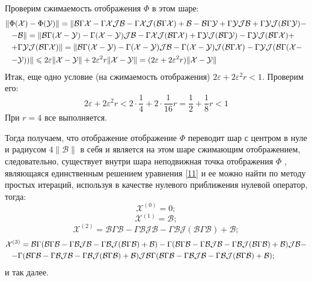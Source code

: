
Проверим сжимаемость отображения $\Phi$ в этом шаре:
\begin{multline*}
\|\Phi (\mathcal{X}) - \Phi (\mathcal{Y}) \| = \| \mathcal{B}\Gamma \mathcal{X} - \Gamma \mathcal{XJB} - \Gamma \mathcal{XJ}(\mathcal{B}\Gamma\mathcal{X}) + \mathcal{B} - \mathcal{B}\Gamma \mathcal{Y} + \Gamma \mathcal{YJB} + \Gamma \mathcal{YJ}(\mathcal{B}\Gamma\mathcal{Y}) - \\ 
\shoveleft{ -\mathcal{B}\| = \| \mathcal{B}\Gamma (\mathcal{X-Y}) - \Gamma (\mathcal{X-Y})\mathcal{JB} - \Gamma\mathcal{XJ}(\mathcal{B}\Gamma\mathcal{X}) + \Gamma \mathcal{YJ} (\mathcal{B}\Gamma\mathcal{Y}) - \Gamma\mathcal{YJ}(\mathcal{B}\Gamma\mathcal{X}) +}\\
\shoveleft{ + \Gamma \mathcal{YJ}(\mathcal{B}\Gamma\mathcal{X}) \| = \| \mathcal{B}\Gamma(\mathcal{X-Y}) - \Gamma\mathcal{(X-Y)}\mathcal{JB} - \Gamma (\mathcal{X- Y}) \mathcal{J}(\mathcal{B}\Gamma\mathcal{X}) - \Gamma \mathcal{YJ}(\mathcal{B}\Gamma(\mathcal{X}-}\\
\shoveleft{ -\mathcal{Y})) \| \leqslant 2\varepsilon \| \mathcal{X-Y} \| + 2\varepsilon ^2 r\| \mathcal{X-Y} \| = (2\varepsilon + 2\varepsilon ^2 r)\| \mathcal{X-Y} \|}\\ 
\end{multline*}
Итак, еще одно условие (на сжимаемость отображения) $2\varepsilon + 2\varepsilon ^2 r < 1.$ Проверим его:
$$
2\varepsilon + 2\varepsilon ^2 r < 2 \cdot \frac{1}{4} + 2 \cdot \frac{1}{16} r = \frac{1}{2} + \frac{1}{8} r < 1
$$
При $r = 4$ все выполняется.

Тогда получаем, что отображение отображение $\Phi$ переводит шар с центром в нуле и радиусом $4\|\mathcal{B}\|$ в себя и является на этом шаре сжимающим отображением, следовательно, существует внутри шара неподвижная точка отображения $\Phi$ , являющаяся единственным решением уравнения \eqref{11} и ее можно найти по методу простых итераций, используя в качестве нулевого приближения нулевой оператор, тогда:
$$
\mathcal{X}^{(0)} = 0;
$$
$$
\mathcal{X}^{(1)} = \mathcal{B};
$$
$$
\mathcal{X}^{(2)} = \mathcal{B}\Gamma\mathcal{B} - \Gamma\mathcal{BJB} - \Gamma\mathcal{BJ}(\mathcal{B}\Gamma\mathcal{B}) + \mathcal{B};
$$
\begin{multline*}
\mathcal{X}^{(3)} = \mathcal{B}\Gamma(\mathcal{B}\Gamma\mathcal{B} - \Gamma\mathcal{BJB} - \Gamma\mathcal{BJ}(\mathcal{B}\Gamma\mathcal{B}) + \mathcal{B})-\Gamma(\mathcal{B}\Gamma\mathcal{B} - \Gamma\mathcal{BJB} - \Gamma\mathcal{BJ}(\mathcal{B}\Gamma\mathcal{B}) + \mathcal{B})\mathcal{JB} - \\
\shoveleft{- \Gamma(\mathcal{B}\Gamma\mathcal{B} - \Gamma\mathcal{BJB} - \Gamma\mathcal{BJ}(\mathcal{B}\Gamma\mathcal{B}) + \mathcal{B})\mathcal{JB} \Gamma(\mathcal{B}\Gamma\mathcal{B} - \Gamma\mathcal{BJB} - \Gamma\mathcal{BJ}(\mathcal{B}\Gamma\mathcal{B}) + \mathcal{B});}
\end{multline*}
и так далее.

